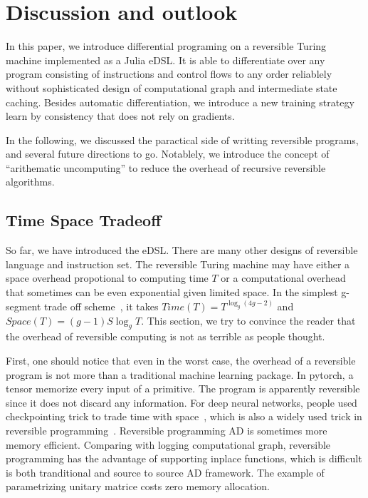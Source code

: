 \documentclass[aps,twocolumn,longbibliography,english,superscriptaddress,prr]{revtex4-1}
\newcommand{\<}{\langle}
\renewcommand{\>}{\rangle}
\theoremstyle{definition}\newtheorem{definition}{\textit{Definition}}
\begin{document}
\section{Discussion and outlook}\label{sec:discussion}
In this paper, we introduce differential programing on a reversible Turing machine implemented as a Julia eDSL.
It is able to differentiate over any program consisting of instructions and control flows to any order reliablely without sophisticated design of computational graph and intermediate state caching.
Besides automatic differentiation, we introduce a new training strategy learn by consistency that does not rely on gradients.

In the following, we discussed the paractical side of writting reversible programs, and several future directions to go.
Notablely, we introduce the concept of ``arithematic uncomputing'' to reduce the overhead of recursive reversible algorithms.

\subsection{Time Space Tradeoff}\label{sec:timespace}
So far, we have introduced the eDSL. There are many other designs of reversible language and instruction set.
The reversible Turing machine may have either a space overhead propotional to computing time $T$ or a computational overhead that sometimes can be even exponential given limited space.
In the simplest g-segment trade off scheme~\cite{Bennett1989,Levine1990}, it takes $Time(T) = T^{\log _g(4g-2)}$ and $Space(T) = (g-1)S\log_g T$.
This section, we try to convince the reader that the overhead of reversible computing is not as terrible as people thought.

First, one should notice that even in the worst case, the overhead of a reversible program is not more than a traditional machine learning package. In pytorch, a tensor memorize every input of a primitive. The program is apparently reversible since it does not discard any information.
For deep neural networks, people used checkpointing trick to trade time with space~\cite{Chen2016}, which is also a widely used trick in reversible programming~\cite{Perumalla2013}. Reversible programming AD is sometimes more memory efficient. Comparing with logging computational graph, reversible programming has the advantage of supporting inplace functions, which is difficult is both tranditional and source to source AD framework. The example of parametrizing unitary matrice costs zero memory allocation.
\end{document}

